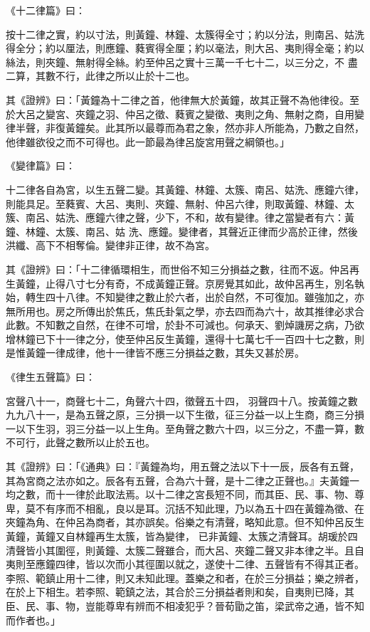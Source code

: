 \begin{pinyinscope}
 《十二律篇》曰：



 按十二律之實，約以寸法，則黃鐘、林鐘、太簇得全寸；約以分法，則南呂、姑洗得全分；約以厘法，則應鐘、蕤賓得全厘；約以毫法，則大呂、夷則得全毫；約以絲法，則夾鐘、無射得全絲。約至仲呂之實十三萬一千七十二，以三分之，不
 盡二算，其數不行，此律之所以止於十二也。



 其《證辨》曰：「黃鐘為十二律之首，他律無大於黃鐘，故其正聲不為他律役。至於大呂之變宮、夾鐘之羽、仲呂之徵、蕤賓之變徵、夷則之角、無射之商，自用變律半聲，非復黃鐘矣。此其所以最尊而為君之象，然亦非人所能為，乃數之自然，他律雖欲役之而不可得也。此一節最為律呂旋宮用聲之綱領也。」



 《變律篇》曰：



 十二律各自為宮，以生五聲二變。其黃鐘、林鐘、太簇、南呂、姑洗、應鐘六律，則能具足。至蕤賓、大呂、夷則、夾鐘、無射、仲呂六律，則取黃鐘、林鐘、太簇、南呂、姑洗、應鐘六律之聲，少下，不和，故有變律。律之當變者有六：黃鐘、林鐘、太簇、南呂、姑
 洗、應鐘。變律者，其聲近正律而少高於正律，然後洪纖、高下不相奪倫。變律非正律，故不為宮。



 其《證辨》曰：「十二律循環相生，而世俗不知三分損益之數，往而不返。仲呂再生黃鐘，止得八寸七分有奇，不成黃鐘正聲。京房覺其如此，故仲呂再生，別名執始，轉生四十八律。不知變律之數止於六者，出於自然，不可復加。雖強加之，亦無所用也。房之所傳出於焦氏，焦氏卦氣之學，亦去四而為六十，故其推律必求合此數。不知數之自然，在律不可增，於卦不可減也。何承天、劉焯譏房之病，乃欲增林鐘已下十一律之分，使至仲呂反生黃鐘，還得十七萬七千一百四十七之數，則是惟黃鐘一律成律，他十一律皆不應三分損益之數，其失又甚於房。



 《律生五聲篇》曰：



 宮聲八十一，商聲七十二，角聲六十四，徵聲五十四，
 羽聲四十八。按黃鐘之數九九八十一，是為五聲之原，三分損一以下生徵，征三分益一以上生商，商三分損一以下生羽，羽三分益一以上生角。至角聲之數六十四，以三分之，不盡一算，數不可行，此聲之數所以止於五也。



 其《證辨》曰：「《通典》曰：『黃鐘為均，用五聲之法以下十一辰，辰各有五聲，其為宮商之法亦如之。辰各有五聲，合為六十聲，是十二律之正聲也。』夫黃鐘一均之數，而十一律於此取法焉。以十二律之宮長短不同，而其臣、民、事、物、尊卑，莫不有序而不相亂，良以是耳。沉括不知此理，乃以為五十四在黃鐘為徵、在夾鐘為角、在仲呂為商者，其亦誤矣。俗樂之有清聲，略知此意。但不知仲呂反生黃鐘，黃鐘又自林鐘再生太簇，皆為變律，
 已非黃鐘、太簇之清聲耳。胡瑗於四清聲皆小其圍徑，則黃鐘、太簇二聲雖合，而大呂、夾鐘二聲又非本律之半。且自夷則至應鐘四律，皆以次而小其徑圍以就之，遂使十二律、五聲皆有不得其正者。李照、範鎮止用十二律，則又未知此理。蓋樂之和者，在於三分損益；樂之辨者，在於上下相生。若李照、範鎮之法，其合於三分損益者則和矣，自夷則已降，其臣、民、事、物，豈能尊卑有辨而不相凌犯乎？晉荀勖之笛，梁武帝之通，皆不知而作者也。」




\end{pinyinscope}
